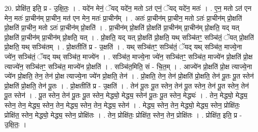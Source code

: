 \documentclass[17pt]{extarticle}
\begin{document}
20. प्रोक्षि॑त॒ इति॒ प्र - उ॒क्षि॒तः॒ । . यदे॑न मेनं॒ ॅयद् यदे॑न॒ मतो ऽत॑ एनं॒ ॅयद् यदे॑न॒ मतः॑ । . ए॒न॒ मतो ऽत॑ एन मेन॒ मतः॑ प्रा॒चीन॑म् प्रा॒चीन॒ मत॑ एन मेन॒ मतः॑ प्रा॒चीन᳚म् । . अतः॑ प्रा॒चीन॑म् प्रा॒चीन॒ मतो ऽतः॑ प्रा॒चीन॑म् प्रो॒क्षति॑ प्रो॒क्षति॑ प्रा॒चीन॒ मतो ऽतः॑ प्रा॒चीन॑म् प्रो॒क्षति॑ । . प्रा॒चीन॑म् प्रो॒क्षति॑ प्रो॒क्षति॑ प्रा॒चीन॑म् प्रा॒चीन॑म् प्रो॒क्षति॒ यद् यत् प्रो॒क्षति॑ प्रा॒चीन॑म् प्रा॒चीन॑म् प्रो॒क्षति॒ यत् । . प्रो॒क्षति॒ यद् यत् प्रो॒क्षति॑ प्रो॒क्षति॒ यथ् सञ्चि॑तꣳ॒॒ सञ्चि॑तं॒ ॅयत् प्रो॒क्षति॑ प्रो॒क्षति॒ यथ् सञ्चि॑तम् । . प्रो॒क्षतीति॑ प्र - उ॒क्षति॑ । . यथ् सञ्चि॑तꣳ॒॒ सञ्चि॑तं॒ ॅयद् यथ् सञ्चि॑त॒ माज्ये॒ना ज्ये॑न॒ सञ्चि॑तं॒ ॅयद् यथ् सञ्चि॑त॒ माज्ये॑न । . सञ्चि॑त॒ माज्ये॒ना ज्ये॑न॒ सञ्चि॑तꣳ॒॒ सञ्चि॑त॒ माज्ये॑न प्रो॒क्षति॑ प्रो॒क्ष त्याज्ये॑न॒ सञ्चि॑तꣳ॒॒ सञ्चि॑त॒ माज्ये॑न प्रो॒क्षति॑ । . सञ्चि॑त॒मिति॒ सं - चि॒त॒म् । . आज्ये॑न प्रो॒क्षति॑ प्रो॒क्ष त्याज्ये॒ना ज्ये॑न प्रो॒क्षति॒ तेन॒ तेन॑ प्रो॒क्ष त्याज्ये॒ना ज्ये॑न प्रो॒क्षति॒ तेन॑ । . प्रो॒क्षति॒ तेन॒ तेन॑ प्रो॒क्षति॑ प्रो॒क्षति॒ तेन॑ पू॒तः पू॒त स्तेन॑ प्रो॒क्षति॑ प्रो॒क्षति॒ तेन॑ पू॒तः । . प्रो॒क्षतीति॑ प्र - उ॒क्षति॑ । . तेन॑ पू॒तः पू॒त स्तेन॒ तेन॑ पू॒त स्तेन॒ तेन॑ पू॒त स्तेन॒ तेन॑ पू॒त स्तेन॑ । . पू॒त स्तेन॒ तेन॑ पू॒तः पू॒त स्तेन॒ मेद्ध्यो॒ मेद्ध्य॒ स्तेन॑ पू॒तः पू॒त स्तेन॒ मेद्ध्यः॑ । . तेन॒ मेद्ध्यो॒ मेद्ध्य॒ स्तेन॒ तेन॒ मेद्ध्य॒ स्तेन॒ तेन॒ मेद्ध्य॒ स्तेन॒ तेन॒ मेद्ध्य॒ स्तेन॑ । . मेद्ध्य॒ स्तेन॒ तेन॒ मेद्ध्यो॒ मेद्ध्य॒ स्तेन॒ प्रोक्षि॑तः॒ प्रोक्षि॑त॒ स्तेन॒ मेद्ध्यो॒ मेद्ध्य॒ स्तेन॒ प्रोक्षि॑तः । . तेन॒ प्रोक्षि॑तः॒ प्रोक्षि॑त॒ स्तेन॒ तेन॒ प्रोक्षि॑तः । . प्रोक्षि॑त॒ इति॒ प्र - उ॒क्षि॒तः॒ । \newline
\pagebreak
{}
\end{document}
